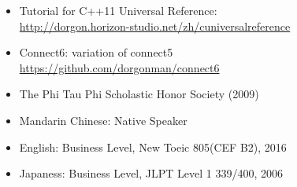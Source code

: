 \documentclass[a4paper,12pt]{memoir} %
\begin{document}
\Sep %
\Sep %
\Sep %




{
  \begin{itemize}
    \item Tutorial for C++11 Universal Reference: \\
        \href{http://dorgon.horizon-studio.net/zh/cuniversalreference}
             {http://dorgon.horizon-studio.net/zh/cuniversalreference} \\

        \item Connect6: variation of connect5  \\
        \href{https://github.com/dorgonman/connect6}
        {https://github.com/dorgonman/connect6} \\   

  \end{itemize}



}



\Sep %
\Sep %
\Sep %



\begin{itemize}
  \item The Phi Tau Phi Scholastic Honor Society (2009)
\end{itemize}


\Sep %
\Sep %
\Sep %

\begin{itemize}
  \item Mandarin Chinese: Native Speaker
  \item English: Business Level, New Toeic 805(CEF B2), 2016
  \item Japaness: Business Level, JLPT Level 1 339/400, 2006
\end{itemize}


\Sep %
\Sep %
\Sep %
\end{document}
